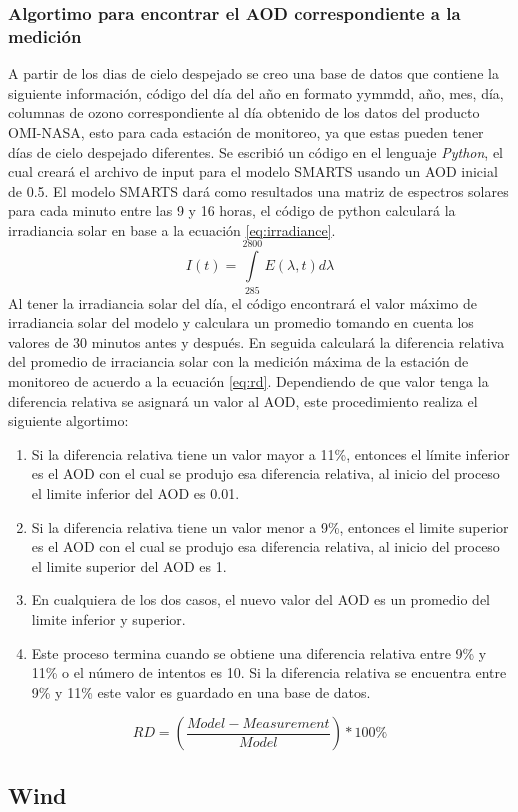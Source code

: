 \subsubsection{Algortimo para encontrar el AOD correspondiente a la medición}
A partir de los dias de cielo despejado se creo una base de datos que contiene la siguiente información,
código del día del año en formato yymmdd, año, mes, día, columnas de ozono correspondiente al día obtenido de los datos del
producto OMI-NASA, esto para cada estación de monitoreo, ya que estas pueden tener días de cielo despejado diferentes.
Se escribió un código en el lenguaje \textit{Python}, el cual creará el archivo de input para el modelo SMARTS usando
un AOD inicial de 0.5. El modelo SMARTS dará como resultados una matriz de espectros solares para cada  minuto entre las 9 y 16 horas,
el código de python calculará la irradiancia solar en base a la ecuación \ref{eq:irradiance}.
\begin{equation}
        I(t) = \int\limits_{285}^{2800} E(\lambda,t) d\lambda
        \label{eq:irradiance}
\end{equation}
Al tener la irradiancia solar del día, el código encontrará el valor máximo de irradiancia solar del modelo y calculara un promedio 
tomando en cuenta los valores de 30 minutos antes y después. En seguida calculará la diferencia relativa
del promedio de irraciancia solar con la medición máxima de la estación de monitoreo de acuerdo a la ecuación \ref{eq:rd}. Dependiendo de que valor tenga la diferencia relativa
se asignará un valor al AOD, este procedimiento realiza el siguiente algortimo:
\begin{enumerate}
    \item Si la diferencia relativa tiene un valor mayor a 11\%, entonces el límite inferior es el AOD con el cual se produjo esa diferencia relativa, al inicio del proceso el limite inferior del AOD es 0.01.
    \item Si la diferencia relativa tiene un valor menor a 9\%, entonces el limite superior es el AOD con el cual se produjo esa diferencia relativa, al inicio del proceso el limite superior del AOD es 1.
    \item En cualquiera de los dos casos, el nuevo valor del AOD es un promedio del limite inferior y superior.
    \item Este proceso termina cuando se obtiene una diferencia relativa entre 9\% y 11\% o el número de intentos es 10. Si la diferencia relativa se encuentra entre 9\% y 11\% este valor es guardado en una base de datos.
\end{enumerate}
\begin{equation}
    RD = \left(\frac{Model-Measurement}{Model}\right)*100\%
    \label{eq:rd}
\end{equation}
\subsection{Wind}